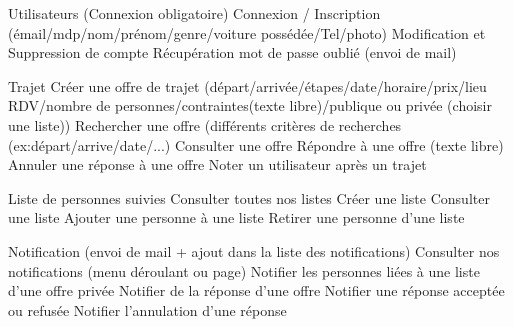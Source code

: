 Utilisateurs
(Connexion obligatoire)
	Connexion / Inscription (émail/mdp/nom/prénom/genre/voiture possédée/Tel/photo)
	Modification et Suppression de compte
	Récupération mot de passe oublié (envoi de mail)

Trajet
    Créer une offre de trajet (départ/arrivée/étapes/date/horaire/prix/lieu RDV/nombre de personnes/contraintes(texte libre)/publique ou privée (choisir une liste))
    Rechercher une offre (différents critères de recherches (ex:départ/arrive/date/...)
    Consulter une offre
    Répondre à une offre (texte libre)
    Annuler une réponse à une offre
    Noter un utilisateur après un trajet

Liste de personnes suivies
    Consulter toutes nos listes
    Créer une liste
    Consulter une liste
    Ajouter une personne à une liste
    Retirer une personne d'une liste

Notification
(envoi de mail + ajout dans la liste des notifications)
    Consulter nos notifications (menu déroulant ou page)
    Notifier les personnes liées à une liste d'une offre privée
    Notifier de la réponse d'une offre
    Notifier une réponse acceptée ou refusée
    Notifier l'annulation d'une réponse
    